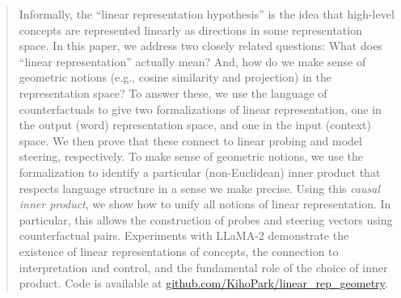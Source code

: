 \documentclass{article}
\theoremstyle{plain}
\theoremstyle{definition}
\theoremstyle{remark}
\begin{document}


\printAffiliationsAndNotice{}

\begin{abstract}
Informally, the ``linear representation hypothesis'' is the idea that high-level concepts are represented linearly as directions in some representation space.
In this paper, we address two closely related questions: What does ``linear representation'' actually mean? And, how do we make sense of geometric notions (e.g., cosine similarity and projection) in the representation space?  
To answer these, we use the language of counterfactuals to give two formalizations of linear representation, one in the output (word) representation space, and one in the input (context) space.
We then prove that these connect to linear probing and model steering, respectively.
To make sense of geometric notions, we use the formalization to identify a particular (non-Euclidean) inner product that respects language structure in a sense we make precise.
Using this \emph{causal inner product}, we show how to unify all notions of linear representation.
In particular, this allows the construction of probes and steering vectors using counterfactual pairs.
Experiments with LLaMA-2 demonstrate the existence of linear representations of concepts, the connection to interpretation and control, and the fundamental role of the choice of inner product.
Code is available at \href{https://github.com/KihoPark/linear_rep_geometry}{github.com/KihoPark/linear\_rep\_geometry}.
\end{abstract}
\end{document}
